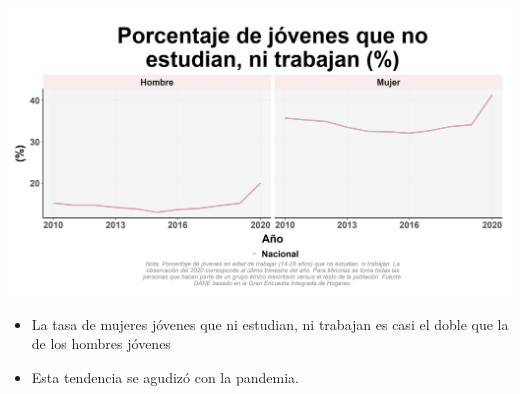 \documentclass[aspectratio=169]{beamer}
\begin{document}
    \begin{slide}{14} 
                      \begin{imagecolumn}
                \includegraphics[width=\columnwidth]{img/var_41_trend.png}
            \end{imagecolumn}
            \begin{textcolumn}
                \begin{itemize}
                    \item La tasa de mujeres jóvenes que ni estudian, ni trabajan es casi el doble que la de los hombres jóvenes
                    \item Esta tendencia se agudizó con la pandemia.
                \end{itemize}
            \end{textcolumn}

    \printcolumns
    \end{slide}
    
\end{document}
